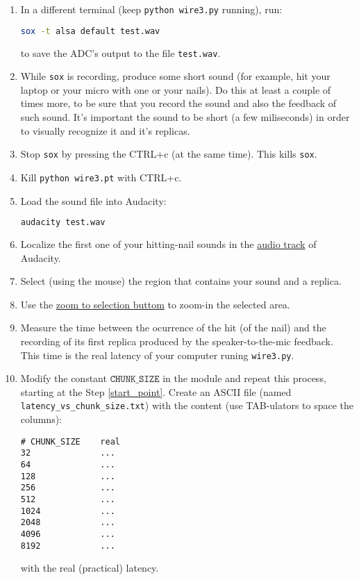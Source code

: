 \begin{enumerate}
\begin{enumerate}
  \item In a different terminal (keep \texttt{python wire3.py}
    running), run:

    \begin{lstlisting}[language=Bash]
sox -t alsa default test.wav
    \end{lstlisting}

    to save the ADC's output to the file \texttt{test.wav}.

  \item While \texttt{sox} is recording, produce some short sound (for
    example, hit your laptop or your micro with one or your nails). Do
    this at least a couple of times more, to be sure that you record
    the sound and also the feedback of such sound. It's important the
    sound to be short (a few miliseconds) in order to visually
    recognize it and it's replicas.

  \item Stop \texttt{sox} by pressing the CTRL+c (at
    the same time). This kills \texttt{sox}.

  \item Kill \texttt{python wire3.pt} with CTRL+c.

  \item Load the sound file into Audacity:
    
    \begin{lstlisting}[language=Bash]
      audacity test.wav
    \end{lstlisting}

  \item Localize the first one of your hitting-nail sounds in the
    \href{https://manual.audacityteam.org/man/audio_tracks.html}{audio
      track} of Audacity.

  \item Select (using the mouse) the region that contains your sound and a replica.

  \item Use the
    \href{https://manual.audacityteam.org/man/edit_toolbar.html#zoom_to_selection}{zoom
      to selection buttom} to zoom-in the selected area.

  \item Measure the time between the ocurrence of the hit (of the
    nail) and the recording of its first replica produced by the
    speaker-to-the-mic feedback. This time is the real latency of your
    computer runing \texttt{wire3.py}.

  \item Modify the constant $\mathtt{CHUNK\_SIZE}$ in the module and
    repeat this process, starting at the Step
    \ref{start_point}. Create an ASCII file (named
    \texttt{latency\_vs\_chunk\_size.txt}) with the content (use
    TAB-ulators to space the columns):
\begin{verbatim}
# CHUNK_SIZE    real
32              ...
64              ...
128             ...
256             ...
512             ...
1024            ...
2048            ...
4096            ...
8192            ...
\end{verbatim}
    with the real (practical) latency.
  \end{enumerate}


\end{enumerate}
